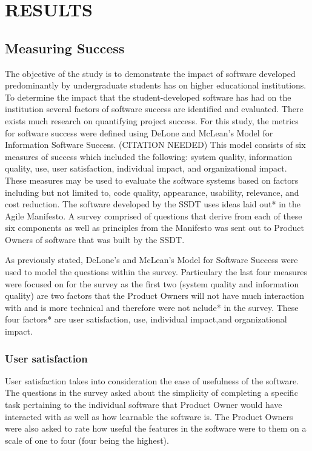 \section{RESULTS}
\subsection{Measuring Success}

The objective of the study is to demonstrate the impact of software developed predominantly by undergraduate students has on higher educational institutions. To determine the impact that the student-developed software has had on the institution several factors of software success are identified and evaluated.  There exists much research on quantifying project success. For this study, the metrics for software success were defined using DeLone and McLean’s Model for Information Software Success. (CITATION NEEDED) This model consists of six measures of success which included the following: system quality, information quality, use, user satisfaction, individual impact, and organizational impact. These measures may be used to evaluate the software systems based on factors including but not limited to, code quality, appearance, usability, relevance, and cost reduction. The software developed by the SSDT uses ideas laid out* in the Agile Manifesto. A survey comprised of questions that derive from each of these six components as well as principles from the Manifesto was sent out to Product Owners of software that was built by the SSDT.

As previously stated, DeLone's and McLean's Model for Software Success were used to model the questions within the survey. Particulary the last four measures were focused on for the survey as the first two (system quality and information quality) are two factors that the Product Owners will not have much interaction with and is more technical and therefore were not nclude* in the survey. These four factors* are user satisfaction, use, individual impact,and organizational impact.

\subsubsection{User satisfaction}
User satisfaction takes into consideration the ease of usefulness of the software. The questions in the survey asked about the simplicity of completing a specific task pertaining to the individual software that Product Owner would have interacted with as well as how learnable the software is. The Product Owners were also asked to rate how useful the features in the software were to them on a scale of one to four (four being the highest).

